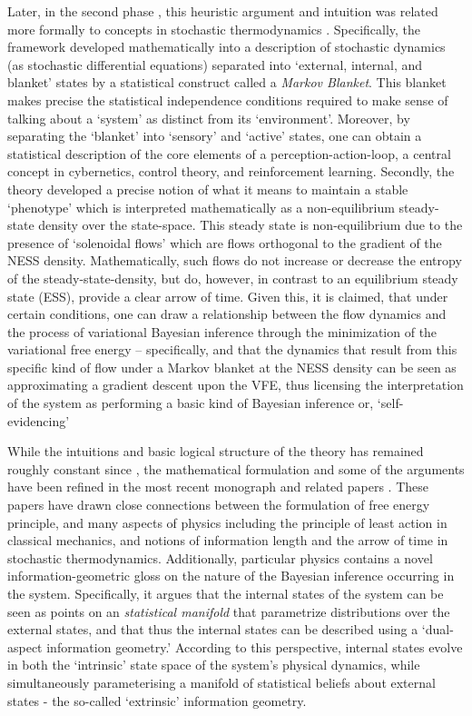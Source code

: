 Later, in the second phase \citep{friston2013life}, this heuristic argument and intuition was related more formally to concepts in stochastic thermodynamics \citep{friston2012ao,friston2012free}. Specifically, the framework developed mathematically into a description of stochastic dynamics (as stochastic differential equations) separated into `external, internal, and blanket' states by a statistical construct called a \emph{Markov Blanket}. This blanket makes precise the statistical independence conditions required to make sense of talking about a `system' as distinct from its `environment'. Moreover, by separating the `blanket' into `sensory' and `active' states, one can obtain a statistical description of the core elements of a perception-action-loop, a central concept in cybernetics, control theory, and reinforcement learning. Secondly, the theory developed a precise notion of what it means to maintain a stable `phenotype' which is interpreted mathematically as a non-equilibrium steady-state density over the state-space. This steady state is non-equilibrium due to the presence of `solenoidal flows' which are flows orthogonal to the gradient of the NESS density. Mathematically, such flows do not increase or decrease the entropy of the steady-state-density, but do, however, in contrast to an equilibrium steady state (ESS), provide a clear arrow of time. Given this, it is claimed, that under certain conditions, one can draw a relationship between the flow dynamics and the process of variational Bayesian inference through the minimization of the variational free energy -- specifically, and that the dynamics that result from this specific kind of flow under a Markov blanket at the NESS density can be seen as approximating a gradient descent upon the VFE, thus licensing the interpretation of the system as performing a basic kind of Bayesian inference or, `self-evidencing' \citep{hohwy2008predictive,clark2015surfing}

While the intuitions and basic logical structure of the theory has remained roughly constant since \citet{friston2013life,friston2012free}, the mathematical formulation and some of the arguments have been refined in the most recent \citet{friston2019particularphysics} monograph and related papers \citep{friston2020some,parr2020markov}. These papers have drawn close connections between the formulation of free energy principle, and many aspects of physics including the principle of least action in classical mechanics, and notions of information length and the arrow of time in stochastic thermodynamics. Additionally, particular physics contains a novel information-geometric gloss on the nature of the Bayesian inference occurring in the system. Specifically, it argues that the internal states of the system can be seen as points on an \emph{statistical manifold} that parametrize distributions over the external states, and that thus the internal states can be described using a `dual-aspect information geometry.' According to this perspective, internal states evolve in both the `intrinsic' state space of the system's physical dynamics, while simultaneously parameterising a manifold of statistical beliefs about external states - the so-called `extrinsic' information geometry. 

